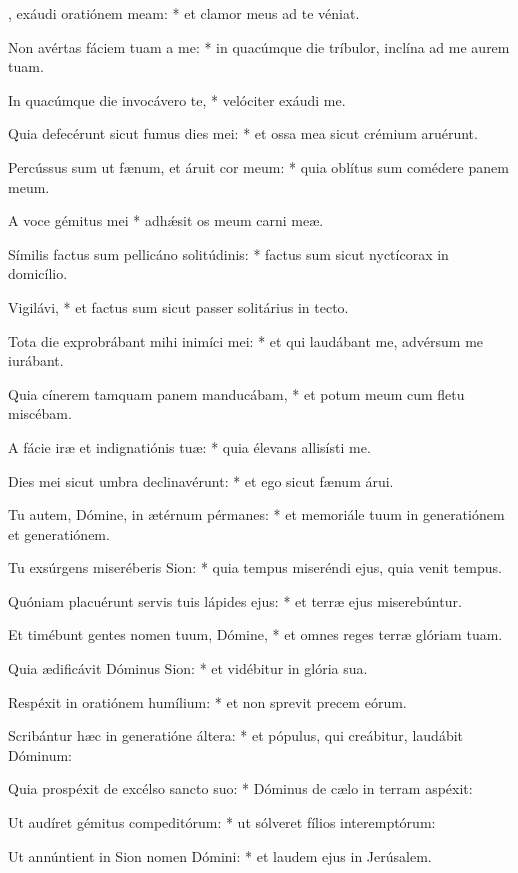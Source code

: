 \begin{psalmus}

, exáudi oratiónem meam: * et clamor meus ad te véniat.

Non avértas fáciem tuam a me: * in quacúmque die tríbulor, inclína ad me aurem tuam.

In quacúmque die invocávero te, * velóciter exáudi me.

Quia defecérunt sicut fumus dies mei: * et ossa mea sicut crémium aruérunt.

Percússus sum ut fænum, et áruit cor meum: * quia oblítus sum comédere panem meum.

A voce gémitus mei * adhǽsit os meum carni meæ.

Símilis factus sum pellicáno solitúdinis: * factus sum sicut nyctícorax in domicílio.

Vigilávi, * et factus sum sicut passer solitárius in tecto.

Tota die exprobrábant mihi inimíci mei: * et qui laudábant me, advérsum me iurábant.

Quia cínerem tamquam panem manducábam, * et potum meum cum fletu miscébam.

A fácie iræ et indignatiónis tuæ: * quia élevans allisísti me.

Dies mei sicut umbra declinavérunt: * et ego sicut fænum árui.

Tu autem, Dómine, in ætérnum pérmanes: * et memoriále tuum in generatiónem et generatiónem.

Tu exsúrgens miseréberis Sion: * quia tempus miseréndi ejus, quia venit tempus.

Quóniam placuérunt servis tuis lápides ejus: * et terræ ejus miserebúntur.

Et timébunt gentes nomen tuum, Dómine, * et omnes reges terræ glóriam tuam.

Quia ædificávit Dóminus Sion: * et vidébitur in glória sua.

Respéxit in oratiónem humílium: * et non sprevit precem eórum.

Scribántur hæc in generatióne áltera: * et pópulus, qui creábitur, laudábit Dóminum:

Quia prospéxit de excélso sancto suo: * Dóminus de cælo in terram aspéxit:

Ut audíret gémitus compeditórum: * ut sólveret fílios interemptórum:

Ut annúntient in Sion nomen Dómini: * et laudem ejus in Jerúsalem.


\end{psalmus}
